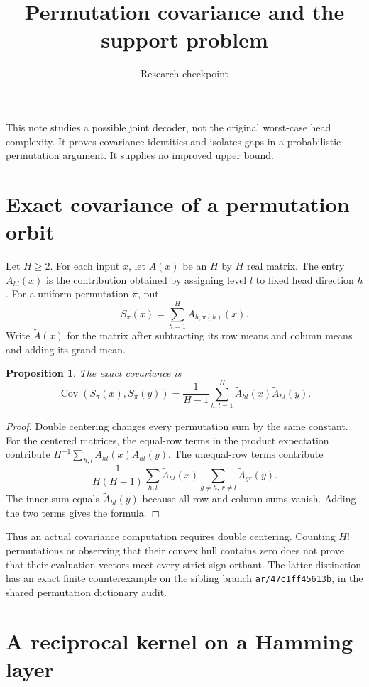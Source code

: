 \documentclass[11pt]{article}
\newtheorem{proposition}{Proposition}
\begin{document}
\title{Permutation covariance and the support problem}
\author{Research checkpoint}
\maketitle

This note studies a possible joint decoder, not the original worst-case
head complexity. It proves covariance identities and isolates gaps in a
probabilistic permutation argument. It supplies no improved upper bound.

\section{Exact covariance of a permutation orbit}

Let $H\geq2$. For each input $x$, let $A(x)$ be an $H$ by $H$ real matrix.
The entry $A_{hl}(x)$ is the contribution obtained by assigning level $l$
to fixed head direction $h$. For a uniform permutation $\pi$, put
\[
 S_\pi(x)=\sum_{h=1}^H A_{h,\pi(h)}(x).
\]
Write $\widetilde A(x)$ for the matrix after subtracting its row means and
column means and adding its grand mean.

\begin{proposition}
The exact covariance is
\[
 \operatorname{Cov}(S_\pi(x),S_\pi(y))
 =\frac1{H-1}\sum_{h,l=1}^H
       \widetilde A_{hl}(x)\widetilde A_{hl}(y).
\]
\end{proposition}
\begin{proof}
Double centering changes every permutation sum by the same constant.
For the centered matrices, the equal-row terms in the product expectation
contribute $H^{-1}\sum_{h,l}\widetilde A_{hl}(x)\widetilde A_{hl}(y)$.
The unequal-row terms contribute
\[
 \frac1{H(H-1)}\sum_{h,l}\widetilde A_{hl}(x)
       \sum_{g\ne h,\ r\ne l}\widetilde A_{gr}(y).
\]
The inner sum equals $\widetilde A_{hl}(y)$ because all row and column sums
vanish. Adding the two terms gives the formula.
\end{proof}

Thus an actual covariance computation requires double centering. Counting
$H!$ permutations or observing that their convex hull contains zero does
not prove that their evaluation vectors meet every strict sign orthant.
The latter distinction has an exact finite counterexample on the sibling
branch \texttt{ar/47c1ff45613b}, in the shared permutation dictionary audit.

\section{A reciprocal kernel on a Hamming layer}
\end{document}

